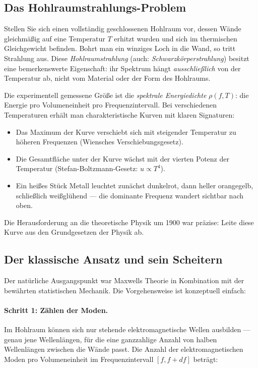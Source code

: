 \subsection{Das Hohlraumstrahlungs-Problem}

Stellen Sie sich einen vollständig geschlossenen Hohlraum vor, dessen Wände gleichmäßig 
auf eine Temperatur $T$ erhitzt wurden und sich im thermischen Gleichgewicht befinden. 
Bohrt man ein winziges Loch in die Wand, so tritt Strahlung aus. Diese \emph{Hohlraumstrahlung} 
(auch: \emph{Schwarzkörperstrahlung}) besitzt eine bemerkenswerte Eigenschaft: ihr 
Spektrum hängt \emph{ausschließlich} von der Temperatur ab, nicht vom Material oder 
der Form des Hohlraums.

Die experimentell gemessene Größe ist die \emph{spektrale Energiedichte} $\rho(f, T)$: 
die Energie pro Volumeneinheit pro Frequenzintervall. Bei verschiedenen Temperaturen 
erhält man charakteristische Kurven mit klaren Signaturen:
\begin{itemize}
    \item Das Maximum der Kurve verschiebt sich mit steigender Temperatur zu höheren 
    Frequenzen (Wiensches Verschiebungsgesetz).
    \item Die Gesamtfläche unter der Kurve wächst mit der vierten Potenz der Temperatur 
    (Stefan-Boltzmann-Gesetz: $u \propto T^4$).
    \item Ein heißes Stück Metall leuchtet zunächst dunkelrot, dann heller orangegelb, 
    schließlich weißglühend — die dominante Frequenz wandert sichtbar nach oben.
\end{itemize}

Die Herausforderung an die theoretische Physik um 1900 war präzise: Leite diese Kurve 
aus den Grundgesetzen der Physik ab.

\subsection{Der klassische Ansatz und sein Scheitern}

Der natürliche Ausgangspunkt war Maxwells Theorie in Kombination mit der bewährten 
statistischen Mechanik. Die Vorgehensweise ist konzeptuell einfach:

\paragraph{Schritt 1: Zählen der Moden.}
Im Hohlraum können sich nur stehende elektromagnetische Wellen ausbilden — genau jene 
Wellenlängen, für die eine ganzzahlige Anzahl von halben Wellenlängen zwischen die 
Wände passt. Die Anzahl der elektromagnetischen Moden pro Volumeneinheit im 
Frequenzintervall $[f, f + df]$ beträgt:

